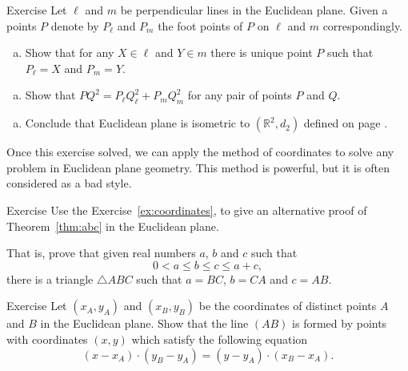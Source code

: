 \begin{thm}{Exercise}\label{ex:coordinates} 
Let $\ell$ and $m$ be perpendicular lines in the Euclidean plane.
Given a points $P$  denote by $P_\ell$ and $P_m$ the foot points of $P$ on $\ell$ and $m$ correspondingly.


\begin{enumerate}[(a)]
\item Show that for any $X\in \ell$ and $Y\in m$ there is unique point $P$ such that $P_\ell=X$ and $P_m=Y$.
\end{enumerate}

\begin{enumerate}[(a)]\addtocounter{enumi}{1}
\item
Show that 
$PQ^2=P_\ell Q_\ell^2+P_mQ_m^2$
for any pair of points $P$ and $Q$.
\end{enumerate}

\begin{enumerate}[(a)]\addtocounter{enumi}{2}
\item Conclude that Euclidean plane is isometric to $(\mathbb{R}^2,d_2)$ defined on page \pageref{def:d_2}.
\end{enumerate}

\end{thm}

Once this exercise solved, we can apply 
the method of coordinates
to solve any problem in Euclidean plane geometry.
This method is powerful, 
but it is often considered as a bad style.

\begin{thm}{Exercise}\label{ex:abc}
Use the Exercise~\ref{ex:coordinates},
to give an alternative proof of Theorem~\ref{thm:abc} in the Euclidean plane.

That is, prove that given real numbers $a$, $b$ and $c$ such that 
 $$0<a\le b\le c\le a+c,$$
there is a triangle $\triangle ABC$
such that $a=BC$, $b=CA$ and $c=AB$.
\end{thm} 

\begin{thm}{Exercise}\label{ex:line-coord}
Let $(x_A,y_A)$ and $(x_B,y_B)$ be the coordinates of distinct points $A$ and $B$ in the Euclidean plane.
Show that the line $(AB)$ is formed by points with coordinates $(x,y)$ which satisfy the following equation
\[(x-x_A)\cdot (y_B-y_A)=(y-y_A)\cdot (x_B-x_A).\]

\end{thm}










